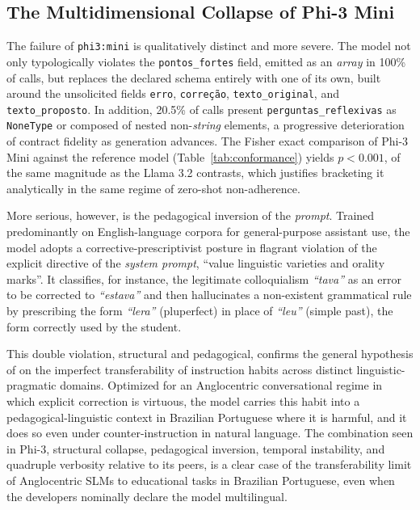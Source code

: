 \documentclass{sbc2023}%
\begin{document}
\subsection{The Multidimensional Collapse of Phi-3 Mini}
\label{sec:phi3}

The failure of \texttt{phi3:mini} is qualitatively distinct and more severe. The model not only typologically violates the \texttt{pontos\_fortes} field, emitted as an \textit{array} in 100\% of calls, but replaces the declared schema entirely with one of its own, built around the unsolicited fields \texttt{erro}, \texttt{correção}, \texttt{texto\_original}, and \texttt{texto\_proposto}. In addition, 20.5\% of calls present \texttt{perguntas\_reflexivas} as \texttt{NoneType} or composed of nested non-\textit{string} elements, a progressive deterioration of contract fidelity as generation advances. The Fisher exact comparison of Phi-3 Mini against the reference model (Table~\ref{tab:conformance}) yields $p<0.001$, of the same magnitude as the Llama 3.2 contrasts, which justifies bracketing it analytically in the same regime of zero-shot non-adherence.

More serious, however, is the pedagogical inversion of the \textit{prompt}. Trained predominantly on English-language corpora for general-purpose assistant use, the model adopts a corrective-prescriptivist posture in flagrant violation of the explicit directive of the \textit{system prompt}, ``value linguistic varieties and orality marks''. It classifies, for instance, the legitimate colloquialism \textit{``tava''} as an error to be corrected to \textit{``estava''} and then hallucinates a non-existent grammatical rule by prescribing the form \textit{``lera''} (pluperfect) in place of \textit{``leu''} (simple past), the form correctly used by the student.

This double violation, structural and pedagogical, confirms the general hypothesis of \citet{wu2023style} on the imperfect transferability of instruction habits across distinct linguistic-pragmatic domains. Optimized for an Anglocentric conversational regime in which explicit correction is virtuous, the model carries this habit into a pedagogical-linguistic context in Brazilian Portuguese where it is harmful, and it does so even under counter-instruction in natural language. The combination seen in Phi-3, structural collapse, pedagogical inversion, temporal instability, and quadruple verbosity relative to its peers, is a clear case of the transferability limit of Anglocentric SLMs to educational tasks in Brazilian Portuguese, even when the developers nominally declare the model multilingual.
\end{document}
